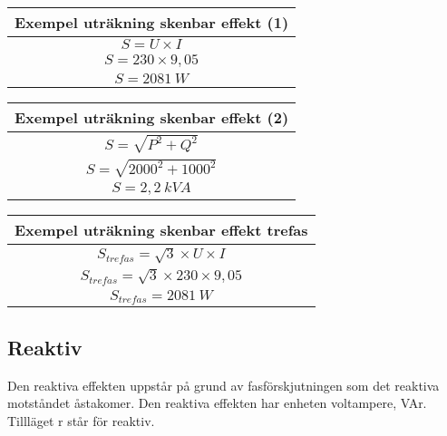 \documentclass[
]{book}
\begin{document}
\begin{longtable}[]{@{}c@{}}
\toprule()
Exempel uträkning skenbar effekt (1) \\
\midrule()
\endhead
\( S=U \times I \) \\
\( S=230 \times 9,05 \) \\
\( S=2081 \ W \) \\
\bottomrule()
\end{longtable}

\begin{longtable}[]{@{}c@{}}
\toprule()
Exempel uträkning skenbar effekt (2) \\
\midrule()
\endhead
\( S= \sqrt{P^2 + Q^2} \) \\
\( S= \sqrt{2000^2 + 1000^2} \) \\
\( S=2,2 \ kVA \) \\
\bottomrule()
\end{longtable}

\begin{longtable}[]{@{}c@{}}
\toprule()
Exempel uträkning skenbar effekt trefas \\
\midrule()
\endhead
\( S_{trefas}= \sqrt{3} \times U \times I \) \\
\( S_{trefas}= \sqrt{3} \times 230 \times 9,05 \) \\
\( S_{trefas}=2081 \ W \) \\
\bottomrule()
\end{longtable}

\hypertarget{reaktiv}{%
\subsection{Reaktiv}\label{reaktiv}}

Den reaktiva effekten uppstår på grund av fasförskjutningen som det
reaktiva motståndet åstakomer. Den reaktiva effekten har enheten
voltampere, VAr. Tillläget r står för reaktiv.
\end{document}

